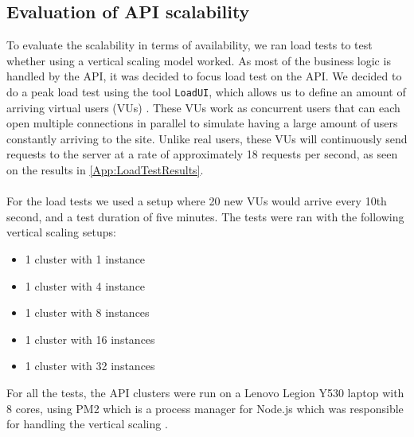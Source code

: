 \subsection{Evaluation of API scalability}
To evaluate the scalability in terms of availability, we ran load tests to test whether using a vertical scaling model worked.
As most of the business logic is handled by the API, it was decided to focus load test on the API.
We decided to do a peak load test using the tool \texttt{LoadUI}, which allows us to define an amount of arriving virtual users (VUs) \cite{loadimpactSource}. 
These VUs work as concurrent users that can each open multiple connections in parallel to simulate having a large amount of users constantly arriving to the site.
Unlike real users, these VUs will continuously send requests to the server at a rate of approximately 18 requests per second, as seen on the results in \autoref{App:LoadTestResults}.
\\\\
For the load tests we used a setup where 20 new VUs would arrive every 10th second, and a test duration of five minutes.
The tests were ran with the following vertical scaling setups:
\begin{itemize}
    \item 1 cluster with 1 instance
    \item 1 cluster with 4 instance
    \item 1 cluster with 8 instances
    \item 1 cluster with 16 instances
    \item 1 cluster with 32 instances
\end{itemize}
For all the tests, the API clusters were run on a Lenovo Legion Y530 laptop with 8 cores, using PM2 which is a process manager for Node.js which was responsible for handling the vertical scaling \cite{PM2}.


